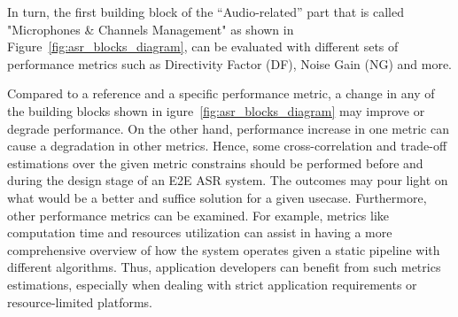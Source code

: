 \bigskip

In turn, the first building block of the 
``Audio-related'' part that is called 
"Microphones \& Channels Management" as shown 
in Figure~\ref{fig:asr_blocks_diagram},
can be evaluated with 
different sets of performance metrics 
such as Directivity Factor (DF),
Noise Gain (NG) and more.

Compared to a reference and a specific performance metric, 
a change in any of the building blocks 
shown in igure~\ref{fig:asr_blocks_diagram} may 
improve or degrade performance. 
On the other hand,
performance increase in one metric can cause 
a degradation in other metrics.
Hence, some cross-correlation and trade-off estimations
over the given metric constrains should be performed
before and during the design stage of an E2E ASR system. 
The outcomes may pour light on what would be a better
and suffice solution for a given usecase. 
Furthermore, other performance metrics can be examined.
For example, metrics like computation time and resources utilization
can assist in having a more comprehensive overview of how the system operates given a
static pipeline with different algorithms.
Thus, application
developers can benefit from such metrics estimations,
especially when dealing with strict 
application requirements or resource-limited platforms.






